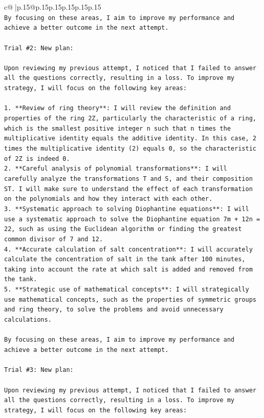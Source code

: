 \documentclass{article}
\begin{document}
{\begin{supertabular}{c@{$\;$}|p{.15\linewidth}@{}p{.15\linewidth}p{.15\linewidth}p{.15\linewidth}p{.15\linewidth}p{.15\linewidth}}
{{{\\ 
\texttt{By focusing on these areas, I aim to improve my performance and achieve a better outcome in the next attempt.} \\
\\ 
\texttt{Trial \#2: New plan: } \\
\\ 
\texttt{Upon reviewing my previous attempt, I noticed that I failed to answer all the questions correctly, resulting in a loss. To improve my strategy, I will focus on the following key areas:} \\
\\ 
\texttt{1. **Review of ring theory**: I will review the definition and properties of the ring 2Z, particularly the characteristic of a ring, which is the smallest positive integer n such that n times the multiplicative identity equals the additive identity. In this case, 2 times the multiplicative identity (2) equals 0, so the characteristic of 2Z is indeed 0.} \\
\texttt{2. **Careful analysis of polynomial transformations**: I will carefully analyze the transformations T and S, and their composition ST. I will make sure to understand the effect of each transformation on the polynomials and how they interact with each other.} \\
\texttt{3. **Systematic approach to solving Diophantine equations**: I will use a systematic approach to solve the Diophantine equation 7m + 12n = 22, such as using the Euclidean algorithm or finding the greatest common divisor of 7 and 12.} \\
\texttt{4. **Accurate calculation of salt concentration**: I will accurately calculate the concentration of salt in the tank after 100 minutes, taking into account the rate at which salt is added and removed from the tank.} \\
\texttt{5. **Strategic use of mathematical concepts**: I will strategically use mathematical concepts, such as the properties of symmetric groups and ring theory, to solve the problems and avoid unnecessary calculations.} \\
\\ 
\texttt{By focusing on these areas, I aim to improve my performance and achieve a better outcome in the next attempt.} \\
\\ 
\texttt{Trial \#3: New plan: } \\
\\ 
\texttt{Upon reviewing my previous attempt, I noticed that I failed to answer all the questions correctly, resulting in a loss. To improve my strategy, I will focus on the following key areas:} \\
}}}
\end{supertabular}}
\end{document}
